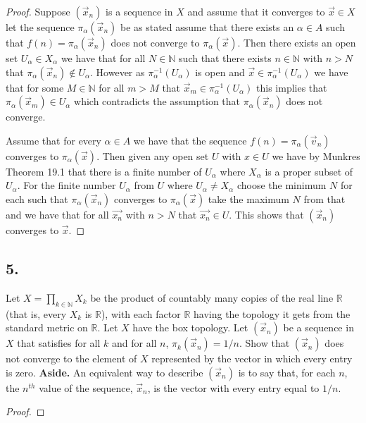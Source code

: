 \documentclass{amsart}
\theoremstyle{plain}
\theoremstyle{definition}
\theoremstyle{remark}
\begin{document}
\begin{proof}
    Suppose $(\vec{x}_n)$ is a sequence in $X$ and assume that it converges to $\vec{x}\in X$ let the sequence $\pi_\alpha(\vec{x}_n)$ be as stated assume that there exists an $\alpha \in A$ such that $f(n)=\pi_\alpha(\vec x_n)$ does not converge to $\pi_\alpha(\vec x)$. Then there exists an open set $U_\alpha\in X_\alpha$ we have that for all $N\in \mathbb{N}$ such that there exists $n\in \mathbb{N}$ with $n>N$ that $\pi_\alpha(\vec x_n)\not \in U_\alpha$. However as $\pi_\alpha^{-1}(U_\alpha)$ is open and $\vec{x} \in \pi_\alpha^{-1}(U_\alpha)$ we have that for some $M\in \mathbb{N}$ for all $m>M$  that $\vec x_m\in \pi_\alpha^{-1}(U_\alpha)$ this implies that $\pi_\alpha(\vec x_m) \in U_\alpha$ which contradicts the assumption that $\pi_\alpha(\vec x_n)$ does not converge. 
    
    Assume that for every $\alpha\in A$ we have that the sequence $f(n)=\pi_\alpha(\vec v_n)$ converges to $\pi_{\alpha}(\vec x)$. Then given any open set $U$ with $x\in U$ we have by Munkres Theorem 19.1 that there is a finite number of $U_\alpha$ where $X_\alpha$ is a proper subset of $U_\alpha$. For the finite number $U_\alpha$ from $U$ where $U_\alpha\not = X_\alpha$ choose the minimum $N$ for each such that $\pi_\alpha(\vec{x}_n)$ converges to $\pi_\alpha(\vec{x})$ take the maximum $N$ from that and we have that for all $\vec{x_n}$ with $n>N$ that $\vec{x_n}\in U$. This shows that $(\vec x_n)$ converges to $\vec x$.
\end{proof}


\vspace{.15in}

\noindent
\subsection*{5.} Let $X =\prod _{k\in \mathbb N} X_k$ be the product of countably many copies of the real line $\mathbb R$  (that is, every $X_k$ is $\mathbb R$), with each factor $\mathbb R$ having the topology it gets from the standard metric on $\mathbb R$. Let $X$ have the box topology. Let $(\vec{x}_n)$ be a sequence in $X$ that satisfies for all $k$ and for all $n$, $\pi_k  (\vec{x}_n) = 1/n$. Show that $(\vec{x}_n)$ does not converge to the element of $X$ represented by the vector in which every entry is zero. {\bfseries Aside.} An equivalent way to describe $(\vec{x}_n)$ is to say that, for each $n$, the $n^{th}$ value of the sequence, $\vec{x}_n$, is the vector with every entry equal to $1/n$.

 \begin{proof}
    
 \end{proof}

 
\end{document}
